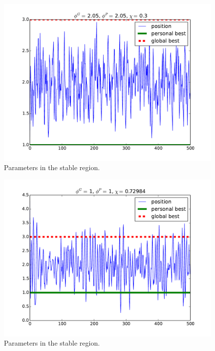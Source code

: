 \begin{figure}
\centering
\includegraphics[width=\linewidth]{./figure/bound_case_4}
\caption{Parameters in the stable region.}
\label{fig:bound_case:d}
\end{figure}

\begin{figure}
\centering
\includegraphics[width=\linewidth]{./figure/bound_case_5}
\caption{Parameters in the stable region.}
\label{fig:bound_case:e}
\end{figure}


